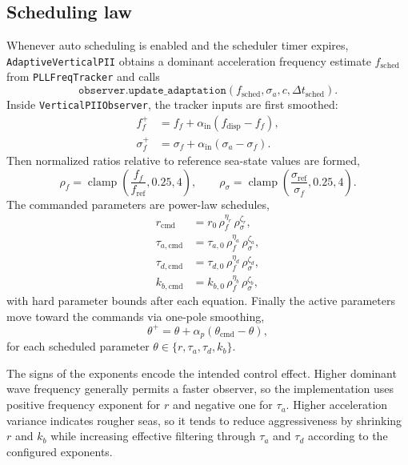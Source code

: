 \documentclass[conference]{IEEEtran}
\DeclareMathOperator{\clamp}{clamp}
\begin{document}
\subsection{Scheduling law}
Whenever auto scheduling is enabled and the scheduler timer expires, \texttt{AdaptiveVerticalPII} obtains a dominant acceleration frequency estimate $f_{\mathrm{sched}}$ from \texttt{PLLFreqTracker} and calls
\begin{equation}
\texttt{observer.update\_adaptation}(f_{\mathrm{sched}},\sigma_a,c,\Delta t_{\mathrm{sched}}).
\end{equation}
Inside \texttt{VerticalPIIObserver}, the tracker inputs are first smoothed:
\begin{align}
 f_f^+ &= f_f + \alpha_{\mathrm{in}}(f_{\mathrm{disp}}-f_f),\\
 \sigma_f^+ &= \sigma_f + \alpha_{\mathrm{in}}(\sigma_a-\sigma_f).
\end{align}
Then normalized ratios relative to reference sea-state values are formed,
\begin{equation}
\rho_f = \clamp\!\left(\frac{f_f}{f_{\mathrm{ref}}},0.25,4\right),\qquad
\rho_\sigma = \clamp\!\left(\frac{\sigma_{\mathrm{ref}}}{\sigma_f},0.25,4\right).
\end{equation}
The commanded parameters are power-law schedules,
\begin{align}
 r_{\mathrm{cmd}} &= r_0\,\rho_f^{\eta_r}\,\rho_\sigma^{\zeta_r},\\
 \tau_{a,\mathrm{cmd}} &= \tau_{a,0}\,\rho_f^{\eta_a}\,\rho_\sigma^{\zeta_a},\\
 \tau_{d,\mathrm{cmd}} &= \tau_{d,0}\,\rho_f^{\eta_d}\,\rho_\sigma^{\zeta_d},\\
 k_{b,\mathrm{cmd}} &= k_{b,0}\,\rho_f^{\eta_b}\,\rho_\sigma^{\zeta_b},
\end{align}
with hard parameter bounds after each equation. Finally the active parameters move toward the commands via one-pole smoothing,
\begin{equation}
\theta^+ = \theta + \alpha_p(\theta_{\mathrm{cmd}}-\theta),
\end{equation}
for each scheduled parameter $\theta\in\{r,\tau_a,\tau_d,k_b\}$.

The signs of the exponents encode the intended control effect. Higher dominant wave frequency generally permits a faster observer, so the implementation uses positive frequency exponent for $r$ and negative one for $\tau_a$. Higher acceleration variance indicates rougher seas, so it tends to reduce aggressiveness by shrinking $r$ and $k_b$ while increasing effective filtering through $\tau_a$ and $\tau_d$ according to the configured exponents.
\end{document}
